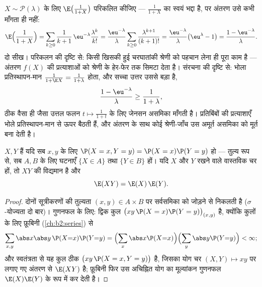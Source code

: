 \begin{example}\label{ex:b2:randomvar:transferex}
$X \sim \mathcal P(\lambda)$ के लिए $\E\bigl(\frac1{1+X}\bigr)$ परिकलित कीजिए --- $\frac1{1+X}$ का  स्वयं भद्दा है, पर
अंतरण उसे कभी माँगता ही नहीं:
\[
\E\Bigl(\frac1{1+X}\Bigr)
= \sum_{k\geq0}\frac{1}{k+1}\,\eu^{-\lambda}
\frac{\lambda^k}{k!}
= \frac{\eu^{-\lambda}}{\lambda}\sum_{k\geq0}
\frac{\lambda^{k+1}}{(k+1)!}
= \frac{\eu^{-\lambda}}{\lambda}\bigl(\eu^\lambda - 1\bigr)
= \frac{1 - \eu^{-\lambda}}{\lambda} .
\]
दो सीख। परिकलन की दृष्टि से: किसी खिसकी हुई चरघातांकी श्रेणी को
पहचान लेना ही पूरा काम है --- अंतरण $f(X)$ की प्रत्याशाओं को श्रेणी
के हेर-फेर तक सिमटा देता है। संरचना की दृष्टि से: भोला
प्रतिस्थापन-मान $\frac1{1 + \E X} =
\frac1{1 + \lambda}$ होता, और सच्चा उत्तर उससे बड़ा है,
\[
\frac{1 - \eu^{-\lambda}}{\lambda} \geq
\frac{1}{1 + \lambda},
\]
ठीक वैसा ही जैसा उत्तल फलन $t
\mapsto \frac1{1+t}$ के लिए जेनसन असमिका माँगती है। 
प्रतिबिंबों की प्रत्याशाएँ भोले प्रतिस्थापन-मान से ऊपर बैठती हैं,
और अंतरण के साथ कोई श्रेणी-जाँच उस अमूर्त असमिका को मूर्त बना देती
है।
\end{example}

\begin{theorem}[स्वतंत्रता और गुणनफल]\label{thm:b2:randomvar:product}
 $X, Y$ \emph{} हैं यदि सब $x, y$ के लिए $\P(X = x, Y =
y) = \P(X = x)\P(Y = y)$ हो ---
तुल्य रूप से, सब $A,
B$ के लिए घटनाएँ $\{X \in A\}$ तथा $\{Y \in B\}$  हों। यदि
$X$ और $Y$  रखने वाले  वास्तविक चर हों, तो $XY$ की
 विद्यमान है और
\[
\E(XY) = \E(X)\,\E(Y) .
\]
\end{theorem}

\begin{proof}
दोनों सूत्रीकरणों की तुल्यता $(x, y) \in A \times B$ पर  सर्वसमिका को जोड़ने
से निकलती है ($\sigma$-योज्यता दो बार)। गुणनफल के लिए: द्विक कुल $\bigl(xy\,\P(X = x)\P(Y = y)\bigr)_{(x,y)}$
 है, क्योंकि कुलों के लिए फ़ूबिनी (\cref{ch:b2:series}) से
\[
\sum_{x, y}\abs x \abs y\,\P(X{=}x)\P(Y{=}y)
= \Bigl(\sum_x \abs x \P(X{=}x)\Bigr)
\Bigl(\sum_y \abs y \P(Y{=}y)\Bigr) < \infty ;
\]
और स्वतंत्रता से यह कुल ठीक $\bigl(xy\,\P(X = x, Y =
y)\bigr)$ है, जिसका योग चर $(X, Y) \mapsto xy$ पर लगाए गए
अंतरण से $\E(XY)$ है; फ़ूबिनी फिर उस अचिह्नित योग का मूल्यांकन गुणनफल
$\E(X)\E(Y)$ के रूप में कर देती है।
\end{proof}

